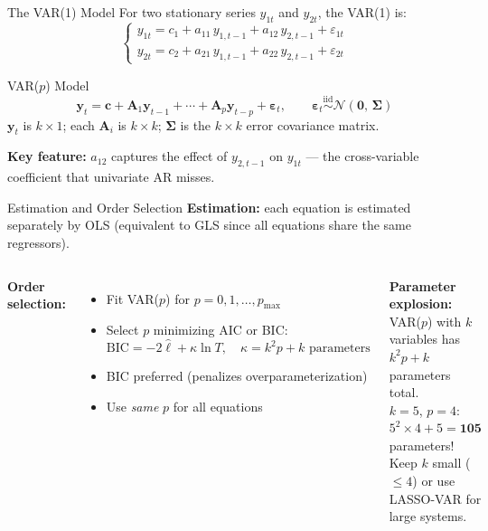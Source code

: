 \documentclass[aspectratio=169, 11pt]{beamer}
\begin{document}
\begin{frame}{The VAR(1) Model}
  For two stationary series $y_{1t}$ and $y_{2t}$, the VAR(1) is:
  \[
    \begin{cases}
      y_{1t} = c_1 + a_{11}\,y_{1,t-1} + a_{12}\,y_{2,t-1} + \varepsilon_{1t}\\[4pt]
      y_{2t} = c_2 + a_{21}\,y_{1,t-1} + a_{22}\,y_{2,t-1} + \varepsilon_{2t}
    \end{cases}
  \]
  \begin{definitionbox}{VAR($p$) Model}
    {\small
    \[
      \mathbf{y}_t = \mathbf{c} + \mathbf{A}_1\mathbf{y}_{t-1}
                   + \cdots + \mathbf{A}_p\mathbf{y}_{t-p}
                   + \boldsymbol{\varepsilon}_t,
      \qquad \boldsymbol{\varepsilon}_t \overset{\mathrm{iid}}{\sim}
      \mathcal{N}(\mathbf{0},\,\boldsymbol{\Sigma})
    \]
    $\mathbf{y}_t$ is $k\!\times\!1$; each $\mathbf{A}_i$ is $k\!\times\!k$;
    $\boldsymbol{\Sigma}$ is the $k\!\times\!k$ error covariance matrix.
    }
  \end{definitionbox}
  \textbf{Key feature:} $a_{12}$ captures the effect of $y_{2,t-1}$ on $y_{1t}$
  --- the cross-variable coefficient that univariate AR misses.
\end{frame}

\begin{frame}{Estimation and Order Selection}
  \textbf{Estimation:} each equation is estimated separately by OLS
  (equivalent to GLS since all equations share the same regressors).
  \begin{columns}[T]
      \textbf{Order selection:}
      \begin{itemize}\small
        \item Fit VAR($p$) for $p = 0, 1, \ldots, p_{\max}$
        \item Select $p$ minimizing AIC or BIC:
          \[
            \mathrm{BIC} = -2\hat{\ell} + \kappa\ln T,
            \quad \kappa = k^2p+k \text{ parameters}
          \]
        \item BIC preferred (penalizes overparameterization)
        \item Use \emph{same} $p$ for all equations
      \end{itemize}
      \begin{warningbox}
        {\small \textbf{Parameter explosion:} VAR($p$) with $k$ variables
        has $k^2 p + k$ parameters total.\\[2pt]
        $k=5$, $p=4$: $5^2\times4+5=\mathbf{105}$ parameters!\\[2pt]
        Keep $k$ small ($\leq 4$) or use LASSO-VAR for large systems.}
      \end{warningbox}
  \end{columns}
\end{frame}
\end{document}
